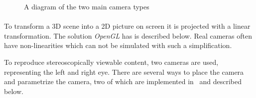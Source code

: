 \begin{figure}[hbt]
\begin{center}
\caption{A diagram of the two main camera types}
\end{center}
\end{figure}

\paragraph{}
To transform a 3D scene into a 2D picture on screen it is projected with a linear transformation.
The solution \textit{OpenGL} has is described below.
Real cameras often have non-linearities which can not be simulated with such a simplification.

To reproduce stereoscopically viewable content, two cameras are used, representing the left and right eye.
There are several ways to place the camera and parametrize the camera, two of which are implemented in \ER\ and described below.

